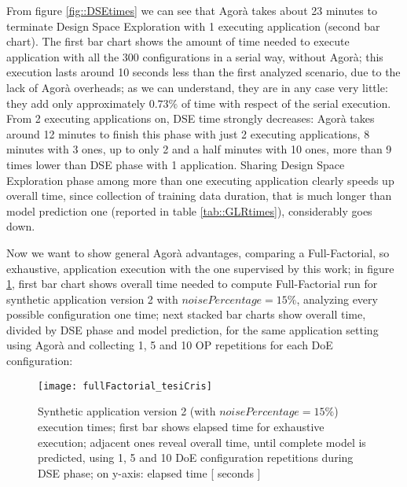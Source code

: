 From figure \ref{fig::DSEtimes} we can see that Agorà takes about 23 minutes to terminate Design Space Exploration with 1 executing application (second bar chart). The first bar chart shows the amount of time needed to execute application with all the 300 configurations in a serial way, without Agorà; this execution lasts around 10 seconds less than the first analyzed scenario, due to the lack of Agorà overheads; as we can understand, they are in any case very little: they add only approximately $0.73\%$ of time with respect of the serial execution. From 2 executing applications on, DSE time strongly decreases: Agorà takes around 12 minutes to finish this phase with just 2 executing applications, 8 minutes with 3 ones, up to only 2 and a half minutes with 10 ones, more than 9 times lower than DSE phase with 1 application. Sharing Design Space Exploration phase among more than one executing application clearly speeds up overall time, since collection of training data duration, that is much longer than model prediction one (reported in table \ref{tab::GLRtimes}), considerably goes down.

Now we want to show general Agorà advantages, comparing a Full-Factorial, so exhaustive, application execution with the one supervised by this work; in figure \ref{fig::full_cris}, first bar chart shows overall time needed to compute Full-Factorial run for synthetic application version 2 with $noisePercentage = 15\%$, analyzing every possible configuration one time; next stacked bar charts show overall time, divided by DSE phase and model prediction, for the same application setting using Agorà and collecting 1, 5 and 10 OP repetitions for each DoE configuration:

\begin{figure}[H]

    \centering
    \texttt{[image: fullFactorial\_tesiCris]}
    \caption{Synthetic application version 2 (with $noisePercentage = 15\%$) execution times; first bar shows elapsed time for exhaustive execution; adjacent ones reveal overall time, until complete model is predicted, using 1, 5 and 10 DoE configuration repetitions during DSE phase; on y-axis: elapsed time [ seconds ]}
    \label{fig::full_cris}
    
\end{figure}

